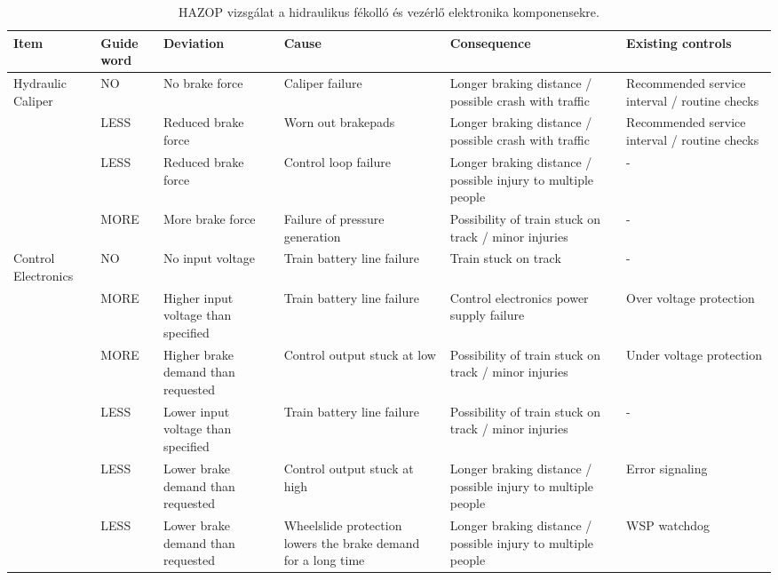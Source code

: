 \begin{table}
    \centering
    \begin{tabular}{ |p{18mm}|p{15mm}|p{20mm}|p{20mm}|p{25mm}|p{25mm}| }
        \hline
        Item & Guide word & Deviation & Cause & Consequence & Existing controls \\
        \hline
        Hydraulic Caliper & NO & No brake force & Caliper failure & Longer braking distance / possible crash with traffic & Recommended service interval / routine checks \\
        & LESS & Reduced brake force & Worn out brakepads & Longer braking distance / possible crash with traffic & Recommended service interval / routine checks \\
        & LESS & Reduced brake force & Control loop failure & Longer braking distance / possible injury to multiple people & - \\
        & MORE & More brake force & Failure of pressure generation & Possibility of train stuck on track / minor injuries & - \\
        \hline
        Control Electronics & NO & No input voltage & Train battery line failure & Train stuck on track & - \\
        & MORE & Higher input voltage than specified & Train battery line failure & Control electronics power supply failure & Over voltage protection \\
        & MORE & Higher brake demand than requested & Control output stuck at low & Possibility of train stuck on track / minor injuries & Under voltage protection \\
        & LESS & Lower input voltage than specified & Train battery line failure & Possibility of train stuck on track / minor injuries & - \\
        & LESS & Lower brake demand than requested & Control output stuck at high & Longer braking distance / possible injury to multiple people & Error signaling \\
        & LESS & Lower brake demand than requested & Wheelslide protection lowers the brake demand for a long time & Longer braking distance / possible injury to multiple people & WSP watchdog \\
        \hline
    \end{tabular}
    \caption{HAZOP vizsgálat a hidraulikus fékolló és vezérlő elektronika komponensekre.}
    \label{tab:hazop_vizsg}
\end{table}